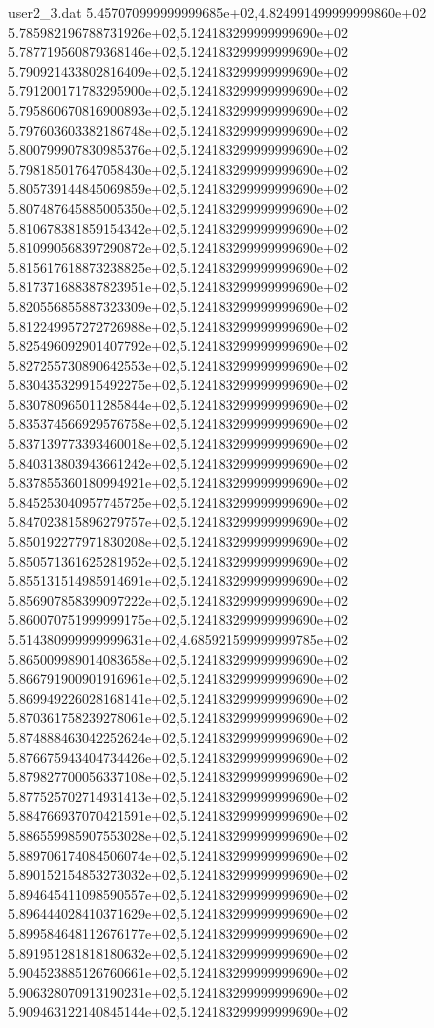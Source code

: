 \begin{filecontents}{user2_3.dat}
5.457070999999999685e+02,4.824991499999999860e+02
5.785982196788731926e+02,5.124183299999999690e+02
5.787719560879368146e+02,5.124183299999999690e+02
5.790921433802816409e+02,5.124183299999999690e+02
5.791200171783295900e+02,5.124183299999999690e+02
5.795860670816900893e+02,5.124183299999999690e+02
5.797603603382186748e+02,5.124183299999999690e+02
5.800799907830985376e+02,5.124183299999999690e+02
5.798185017647058430e+02,5.124183299999999690e+02
5.805739144845069859e+02,5.124183299999999690e+02
5.807487645885005350e+02,5.124183299999999690e+02
5.810678381859154342e+02,5.124183299999999690e+02
5.810990568397290872e+02,5.124183299999999690e+02
5.815617618873238825e+02,5.124183299999999690e+02
5.817371688387823951e+02,5.124183299999999690e+02
5.820556855887323309e+02,5.124183299999999690e+02
5.812249957272726988e+02,5.124183299999999690e+02
5.825496092901407792e+02,5.124183299999999690e+02
5.827255730890642553e+02,5.124183299999999690e+02
5.830435329915492275e+02,5.124183299999999690e+02
5.830780965011285844e+02,5.124183299999999690e+02
5.835374566929576758e+02,5.124183299999999690e+02
5.837139773393460018e+02,5.124183299999999690e+02
5.840313803943661242e+02,5.124183299999999690e+02
5.837855360180994921e+02,5.124183299999999690e+02
5.845253040957745725e+02,5.124183299999999690e+02
5.847023815896279757e+02,5.124183299999999690e+02
5.850192277971830208e+02,5.124183299999999690e+02
5.850571361625281952e+02,5.124183299999999690e+02
5.855131514985914691e+02,5.124183299999999690e+02
5.856907858399097222e+02,5.124183299999999690e+02
5.860070751999999175e+02,5.124183299999999690e+02
5.514380999999999631e+02,4.685921599999999785e+02
5.865009989014083658e+02,5.124183299999999690e+02
5.866791900901916961e+02,5.124183299999999690e+02
5.869949226028168141e+02,5.124183299999999690e+02
5.870361758239278061e+02,5.124183299999999690e+02
5.874888463042252624e+02,5.124183299999999690e+02
5.876675943404734426e+02,5.124183299999999690e+02
5.879827700056337108e+02,5.124183299999999690e+02
5.877525702714931413e+02,5.124183299999999690e+02
5.884766937070421591e+02,5.124183299999999690e+02
5.886559985907553028e+02,5.124183299999999690e+02
5.889706174084506074e+02,5.124183299999999690e+02
5.890152154853273032e+02,5.124183299999999690e+02
5.894645411098590557e+02,5.124183299999999690e+02
5.896444028410371629e+02,5.124183299999999690e+02
5.899584648112676177e+02,5.124183299999999690e+02
5.891951281818180632e+02,5.124183299999999690e+02
5.904523885126760661e+02,5.124183299999999690e+02
5.906328070913190231e+02,5.124183299999999690e+02
5.909463122140845144e+02,5.124183299999999690e+02

\end{filecontents}
